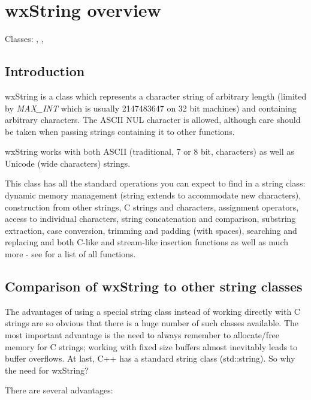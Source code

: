 \section{wxString overview}\label{wxstringoverview}

Classes: , , 

\subsection{Introduction}

wxString is a class which represents a character string of arbitrary length (limited by 
{\it MAX\_INT} which is usually 2147483647 on 32 bit machines) and containing
arbitrary characters. The ASCII NUL character is allowed, although care should be
taken when passing strings containing it to other functions.

wxString works with both ASCII (traditional, 7 or 8 bit, characters) as well as
Unicode (wide characters) strings.

This class has all the standard operations you can expect to find in a string class:
dynamic memory management (string extends to accommodate new characters),
construction from other strings, C strings and characters, assignment operators,
access to individual characters, string concatenation and comparison, substring
extraction, case conversion, trimming and padding (with spaces), searching and
replacing and both C-like  and stream-like
insertion functions as well as much more - see  
for a list of all functions.

\subsection{Comparison of wxString to other string classes}

The advantages of using a special string class instead of working directly with
C strings are so obvious that there is a huge number of such classes available.
The most important advantage is the need to always
remember to allocate/free memory for C strings; working with fixed size buffers almost
inevitably leads to buffer overflows. At last, C++ has a standard string class
(std::string). So why the need for wxString?

There are several advantages:

